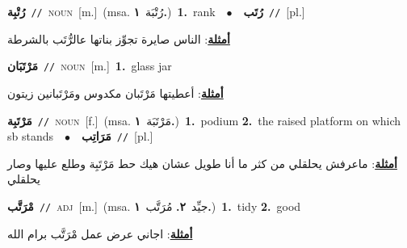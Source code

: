 \documentclass[10pt,a4paper,twoside]{article} %
\begin{document}
\begin{multicols}{2}
{\setlength\topsep{0pt}\textbf{\foreignlanguage{arabic}{رُتْبِة}}\ {\color{gray}\texttt{//}\color{black}}\ \textsc{noun}\ [m.]\ \color{gray}(msa. \foreignlanguage{arabic}{رُتْبَة}~\foreignlanguage{arabic}{\textbf{١.}})\color{black}\ \textbf{1.}~rank\ \ $\bullet$\ \ \setlength\topsep{0pt}\textbf{\foreignlanguage{arabic}{رُتَب}}\ {\color{gray}\texttt{//}\color{black}}\ [pl.]\  \begin{flushright}\color{gray}\foreignlanguage{arabic}{\textbf{\underline{\foreignlanguage{arabic}{أمثلة}}}: الناس صايرة تجوِّز بناتها عالرُّتَب بالشرطة}\end{flushright}\color{black}} \vspace{2mm}

{\setlength\topsep{0pt}\textbf{\foreignlanguage{arabic}{مَرْتَبَان}}\ {\color{gray}\texttt{//}\color{black}}\ \textsc{noun}\ [m.]\ \textbf{1.}~glass jar\  \begin{flushright}\color{gray}\foreignlanguage{arabic}{\textbf{\underline{\foreignlanguage{arabic}{أمثلة}}}: أعطيتها مَرْتَبان مكدوس ومَرْتَبانين زيتون}\end{flushright}\color{black}} \vspace{2mm}

{\setlength\topsep{0pt}\textbf{\foreignlanguage{arabic}{مَرْتَبِة}}\ {\color{gray}\texttt{//}\color{black}}\ \textsc{noun}\ [f.]\ \color{gray}(msa. \foreignlanguage{arabic}{مَرْتَبَة}~\foreignlanguage{arabic}{\textbf{١.}})\color{black}\ \textbf{1.}~podium  \textbf{2.}~the raised platform on which sb stands\ \ $\bullet$\ \ \setlength\topsep{0pt}\textbf{\foreignlanguage{arabic}{مَرَاتِب}}\ {\color{gray}\texttt{//}\color{black}}\ [pl.]\  \begin{flushright}\color{gray}\foreignlanguage{arabic}{\textbf{\underline{\foreignlanguage{arabic}{أمثلة}}}: ماعرفش يحلقلي من كثر ما أنا طويل عشان هيك حط مَرْتَبِة وطلع عليها وصار يحلقلي}\end{flushright}\color{black}} \vspace{2mm}

{\setlength\topsep{0pt}\textbf{\foreignlanguage{arabic}{مْرَتَّب}}\ {\color{gray}\texttt{//}\color{black}}\ \textsc{adj}\ [m.]\ \color{gray}(msa. \foreignlanguage{arabic}{جيِّد}~\foreignlanguage{arabic}{\textbf{٢.}}  \foreignlanguage{arabic}{مُرَتَّب}~\foreignlanguage{arabic}{\textbf{١.}})\color{black}\ \textbf{1.}~tidy  \textbf{2.}~good\  \begin{flushright}\color{gray}\foreignlanguage{arabic}{\textbf{\underline{\foreignlanguage{arabic}{أمثلة}}}: اجاني عرض عمل مْرَتَّب برام الله}\end{flushright}\color{black}} \vspace{2mm}


\end{multicols}
\end{document}
